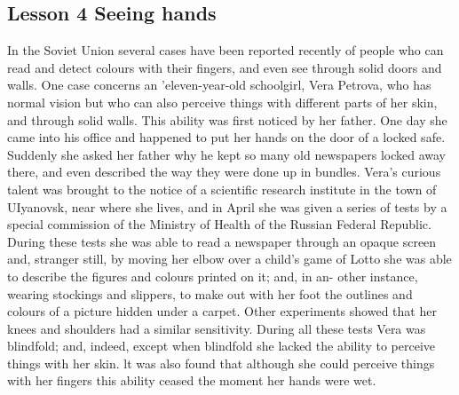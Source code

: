 \documentclass[kindlepaper]{BHCexam4kindle}
\begin{document}
\subsection{Lesson 4
Seeing hands}
In the Soviet Union several cases have been reported recently of people who
can read and detect colours with their fingers, and even see through solid doors
and walls. One case concerns an 'eleven-year-old schoolgirl, Vera Petrova, who
has normal vision but who can also perceive things with different parts of her
skin, and through solid walls. This ability was first noticed by her father. One
day she came into his office and happened to put her hands on the door of a
locked safe. Suddenly she asked her father why he kept so many old newspapers
locked away there, and even described the way they were done up in bundles.
Vera's curious talent was brought to the notice of a scientific research institute
in the town of UIyanovsk, near where she lives, and in April she was given a
series of tests by a special commission of the Ministry of Health of the Russian
Federal Republic. During these tests she was able to read a newspaper through
an opaque screen and, stranger still, by moving her elbow over a child's game of
Lotto she was able to describe the figures and colours printed on it; and, in an-
other instance, wearing stockings and slippers, to make out with her foot the
outlines and colours of a picture hidden under a carpet. Other experiments
showed that her knees and shoulders had a similar sensitivity. During all these
tests Vera was blindfold; and, indeed, except when blindfold she lacked the
ability to perceive things with her skin. lt was also found that although she
could perceive things with her fingers this ability ceased the moment her hands
were wet.
\clearpage
\end{document}
